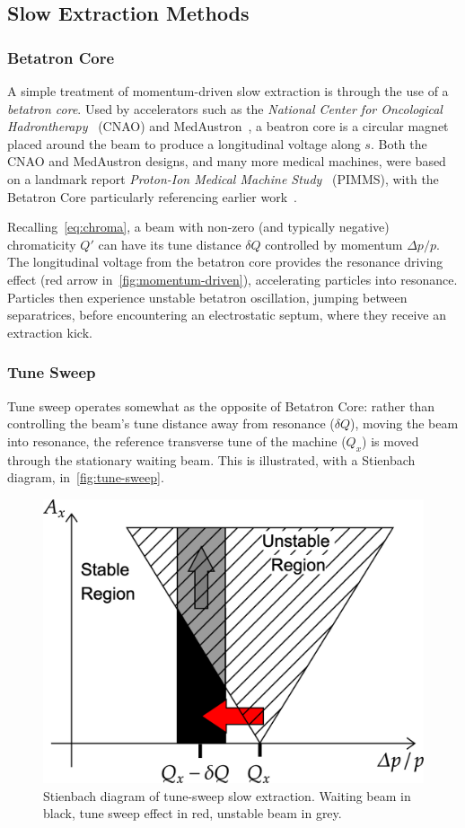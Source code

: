 \documentclass[11pt]{report}
\begin{document}
\subsection{Slow Extraction Methods}

\subsubsection{Betatron Core}

A simple treatment of momentum-driven slow extraction is through the use of a \textit{betatron core}. Used by accelerators such as the \textit{National Center for Oncological Hadrontherapy}~\cite{Falbo:IPAC2018-TUZGBF3} (CNAO) and MedAustron~\cite{pablo}, a beatron core is a circular magnet placed around the beam to produce a longitudinal voltage along $s$. Both the CNAO and MedAustron designs, and many more medical machines, were based on a landmark report \textit{Proton-Ion Medical Machine Study}~\cite{PIMMS} (PIMMS), with the Betatron Core particularly referencing earlier work~\cite{betatroncore}.

Recalling~\autoref{eq:chroma}, a beam with non-zero (and typically negative) chromaticity $Q'$ can have its tune distance $\delta Q$ controlled by momentum $\Delta p/p$. The longitudinal voltage from the betatron core provides the resonance driving effect (red arrow in~\autoref{fig:momentum-driven}), accelerating particles into resonance. Particles then experience unstable betatron oscillation, jumping between separatrices, before encountering an electrostatic septum, where they receive an extraction kick.


\subsubsection{Tune Sweep}
Tune sweep operates somewhat as the opposite of Betatron Core: rather than controlling the beam's tune distance away from resonance ($\delta Q$), moving the beam into resonance, the reference transverse tune of the machine ($Q_x$) is moved through the stationary waiting beam. This is illustrated, with a Stienbach diagram, in~\autoref{fig:tune-sweep}.

\begin{figure}
  \centering
  \includegraphics[width=0.6\linewidth]{tune-sweep.png}
  \caption{Stienbach diagram of tune-sweep slow extraction. Waiting beam in black, tune sweep effect in red, unstable beam in grey.}\label{fig:tune-sweep}
\end{figure}
\end{document}
